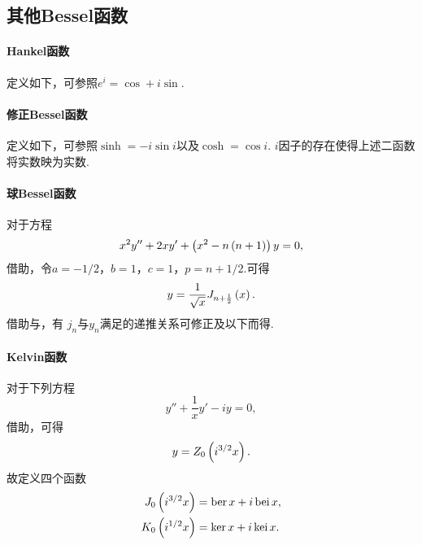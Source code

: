 \documentclass[UTF-8]{ctexart}
\begin{document}
	\subsection{其他Bessel函数}
	\paragraph{Hankel函数}定义如下，可参照$e^i = \cos + i\sin$.
  \paragraph{修正Bessel函数}定义如下，可参照$\sinh = -i\sin i$以及$\cosh = \cos i$.
  $i$因子的存在使得上述二函数将实数映为实数.
  \paragraph{球Bessel函数}对于方程
  \[ x^2y''+2xy'+\left(x^2-n\left(n+1\right)\right)y = 0, \]
  借助，令$a=-1/2$，$b=1$，$c=1$，$p=n+1/2$.可得
  \[ y = \frac{1}{\sqrt{x}}J_{n+\frac{1}{2}}\left(x\right). \]
  借助与，有
  $j_n$与$y_n$满足的递推关系可修正及以下而得.
  \paragraph{Kelvin函数}对于下列方程
  \[ y''+\frac{1}{x}y'-iy=0, \]
  借助，可得
  \[ y = Z_0\left(i^{3/2}x\right). \]
  故定义四个函数
  \begin{align*}
    J_0\left(i^{3/2}x\right) &= \text{ber}\, x + i\, \text{bei}\, x,\\
    K_0\left(i^{1/2}x\right) &= \text{ker}\, x + i\, \text{kei}\, x.
  \end{align*}
\end{document}
